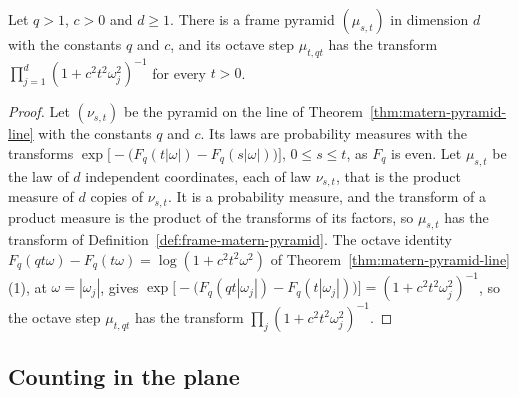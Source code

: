 \begin{proposition}
\label{prop:frame-matern-pyramid-exists}

Let $q > 1$, $c > 0$ and $d \ge 1$. There is a frame \Matern{} pyramid $(\mu_{s,t})$ in dimension
$d$ with the constants $q$ and $c$, and its octave step $\mu_{t,qt}$ has the transform
$\prod_{j=1}^d(1 + c^2t^2\omega_j^2)^{-1}$ for every $t > 0$.
\end{proposition}

\begin{proof}
Let $(\nu_{s,t})$ be the \Matern{} pyramid on the line of Theorem~\ref{thm:matern-pyramid-line}
with the constants $q$ and $c$. Its laws are probability measures with the transforms
$\exp\bigl[-\bigl(F_q(t|\omega|) - F_q(s|\omega|)\bigr)\bigr]$, $0 \le s \le t$, as $F_q$ is even.
Let $\mu_{s,t}$ be the law of $d$ independent coordinates, each of law $\nu_{s,t}$, that is the
product measure of $d$ copies of $\nu_{s,t}$. It is a probability measure, and the transform of a
product measure is the product of the transforms of its factors, so $\mu_{s,t}$ has the transform of
Definition~\ref{def:frame-matern-pyramid}. The octave identity
$F_q(qt\omega) - F_q(t\omega) = \log(1 + c^2t^2\omega^2)$ of
Theorem~\ref{thm:matern-pyramid-line}(1), at $\omega = |\omega_j|$, gives
$\exp\bigl[-\bigl(F_q(qt|\omega_j|) - F_q(t|\omega_j|)\bigr)\bigr] = (1 + c^2t^2\omega_j^2)^{-1}$,
so the octave step $\mu_{t,qt}$ has the transform $\prod_j(1 + c^2t^2\omega_j^2)^{-1}$.
\end{proof}

\subsection{Counting in the plane}
\label{sec:matern-counting}

